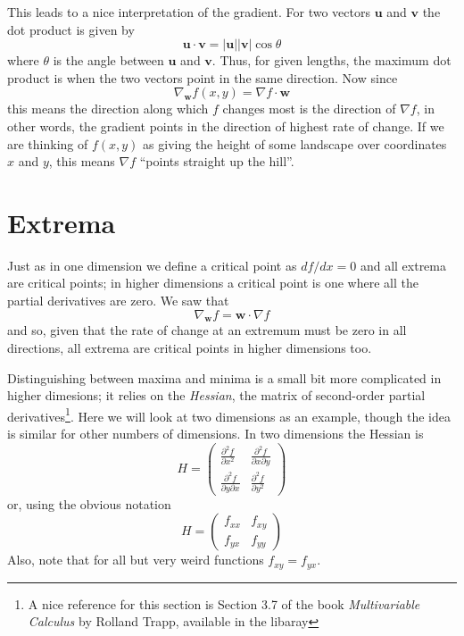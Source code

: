 \documentclass[12pt]{article}
\begin{document}
This leads to a nice interpretation of the gradient. For two vectors
$\textbf{u}$ and $\textbf{v}$ the dot product is given by
\begin{equation}
  \textbf{u}\cdot\textbf{v}=|\textbf{u}||\textbf{v}|\cos{\theta}
\end{equation}
where $\theta$ is the angle between $\textbf{u}$ and
$\textbf{v}$. Thus, for given lengths, the maximum dot product is when
the two vectors point in the same direction. Now since
\begin{equation}
  \nabla_{\mathbf{w}}f(x,y)=\nabla f\cdot \textbf{w}
\end{equation}
this means the direction along which $f$ changes most is the direction
of $\nabla f$, in other words, the gradient points in the direction of
highest rate of change. If we are thinking of $f(x,y)$ as giving the
height of some landscape over coordinates $x$ and $y$, this means
$\nabla f$ ``points straight up the hill''.









\section*{Extrema}

Just as in one dimension we define a critical point as $df/dx=0$ and
all extrema are critical points; in higher dimensions a critical point
is one where all the partial derivatives are zero. We saw that
\begin{equation}
  \nabla_{\mathbf{w}}f=\mathbf{w}\cdot\nabla{}f
\end{equation}
and so, given that the rate of change at an extremum must be zero in
all directions, all extrema are critical points in higher dimensions
too.

Distinguishing between maxima and minima is a small bit more
complicated in higher dimesions; it relies on the \textsl{Hessian},
the matrix of second-order partial derivatives\footnote{A nice reference for this section is Section 3.7 of the book \emph{Multivariable Calculus} by Rolland Trapp, available in the libaray}. Here we will look at
two dimensions as an example, though the idea is similar for other
numbers of dimensions. In two dimensions the Hessian is
\begin{equation}
  H=\left(\begin{array}{cc}\frac{\partial^2f}{\partial x^2}&\frac{\partial^2f}{\partial x\partial y}\\
    \frac{\partial^2f}{\partial y\partial x}&\frac{\partial^2f}{\partial y^2}\end{array}\right)
\end{equation}
or, using the obvious notation
\begin{equation}
  H=\left(\begin{array}{cc}f_{xx}&f_{xy}\\f_{yx}&f_{yy}\end{array}\right)
\end{equation}
Also, note that for all but very weird functions $f_{xy}=f_{yx}$.
\end{document}
